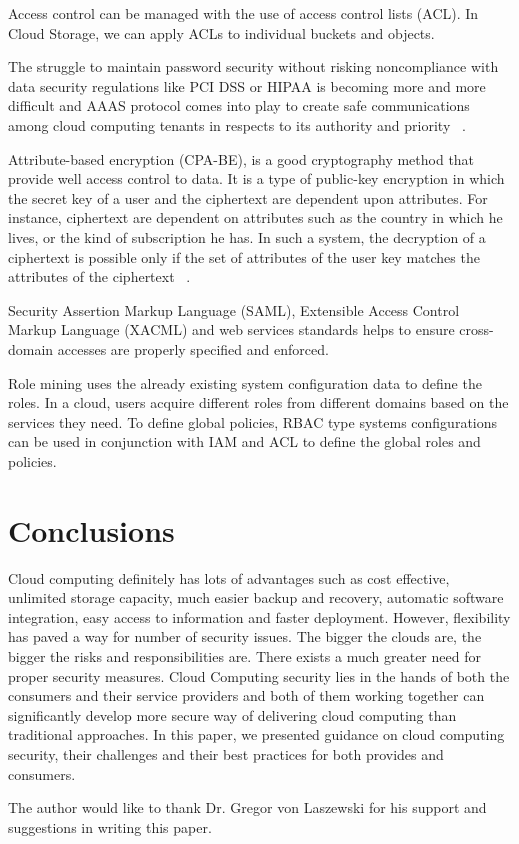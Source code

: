 \documentclass[sigconf]{acmart}
\begin{document}
Access control can be managed with the use of access control lists (ACL).
In Cloud Storage, we can apply ACLs to individual buckets and objects.

The struggle to maintain password security without risking noncompliance
with data security regulations like PCI DSS or HIPAA is becoming more and
more difficult and AAAS protocol comes into play to create safe 
communications among cloud computing tenants in respects to its authority
and priority ~\cite{hid-sp18-513-poland}. 

Attribute-based encryption (CPA-BE), is a good cryptography 
method that provide well access control to data. It is a type of public-key 
encryption in which the secret key of a user and the ciphertext are 
dependent upon attributes. For instance, ciphertext are dependent on attributes 
such as the country in which he lives, or the kind of subscription he has.
In such a system, the decryption of a ciphertext is possible only if the set 
of attributes of the user key matches the attributes of the ciphertext ~\cite{hid-sp18-513-poland}.

Security Assertion Markup Language (SAML), Extensible Access Control Markup Language
(XACML) and web services standards helps to ensure cross-domain accesses are
properly specified and enforced.

Role mining uses the already existing system configuration data to define the roles. 
In a cloud, users acquire different roles from different domains based on the 
services they need. To define global policies, RBAC type systems configurations 
can be used in conjunction with IAM and ACL to define the global roles and 
policies.

\section{Conclusions}
Cloud computing definitely has lots of advantages such as cost effective, 
unlimited storage capacity, much easier backup and recovery, automatic
software integration, easy access to information and faster deployment. 
However, flexibility has paved a way for number of security issues.
The bigger the clouds are, the bigger the risks and responsibilities are. 
There exists a much greater need for proper security measures.
Cloud Computing security lies in the hands of both the consumers and their
service providers and both of them working together can significantly 
develop more secure way of delivering cloud computing than traditional 
approaches. In this paper, we presented guidance on cloud computing security,
their challenges and their best practices for both provides and consumers.

\begin{acks}
The author would like to thank Dr. Gregor von Laszewski for his support and 
suggestions in writing this paper.
\end{acks}



\end{document}
